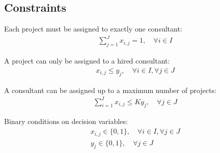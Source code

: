 \documentclass{article}
\begin{document}
\subsection*{Constraints}
Each project must be assigned to exactly one consultant:
\begin{align*}
&\sum_{j=1}^{J} x_{i,j} = 1, \quad \forall i \in I
\end{align*}

A project can only be assigned to a hired consultant:
\begin{align*}
&x_{i,j} \leq y_j, \quad \forall i \in I, \forall j \in J
\end{align*}

A consultant can be assigned up to a maximum number of projects:
\begin{align*}
&\sum_{i=1}^{I} x_{i,j} \leq K y_j, \quad \forall j \in J
\end{align*}

Binary conditions on decision variables:
\begin{align*}
&x_{i,j} \in \{0, 1\}, \quad \forall i \in I, \forall j \in J \\
&y_j \in \{0, 1\}, \quad \forall j \in J
\end{align*}
\end{document}
